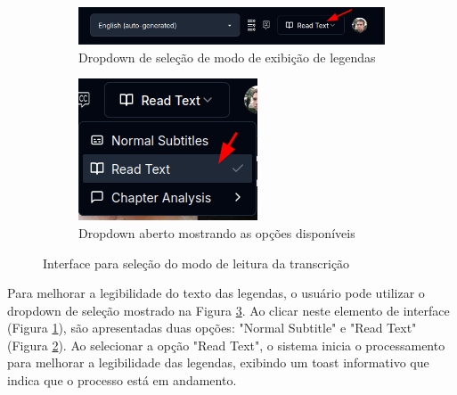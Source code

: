 \documentclass[tcc,capa]{texufpel}
\begin{document}
\begin{figure}[H]
  \centering
  \begin{subfigure}{0.48\textwidth}
    \includegraphics[width=\textwidth,height=0.3\textheight,keepaspectratio]{exemplo-slides/graphics/images/dropdown.png}
    \caption{Dropdown de seleção de modo de exibição de legendas}
    \label{fig:dropdown_closed}
  \end{subfigure}
  \hfill
  \begin{subfigure}{0.48\textwidth}
    \includegraphics[width=\textwidth,height=0.3\textheight,keepaspectratio]{exemplo-slides/graphics/images/dropdown-aberto.png}
    \caption{Dropdown aberto mostrando as opções disponíveis}
    \label{fig:dropdown_open}
  \end{subfigure}
  \caption{Interface para seleção do modo de leitura da transcrição}
  \label{fig:dropdown_interface}
\end{figure}

Para melhorar a legibilidade do texto das legendas, o usuário pode utilizar o dropdown de seleção mostrado na Figura \ref{fig:dropdown_interface}. Ao clicar neste elemento de interface (Figura \ref{fig:dropdown_closed}), são apresentadas duas opções: "Normal Subtitle" e "Read Text" (Figura \ref{fig:dropdown_open}). Ao selecionar a opção "Read Text", o sistema inicia o processamento para melhorar a legibilidade das legendas, exibindo um toast informativo que indica que o processo está em andamento.
\end{document}
